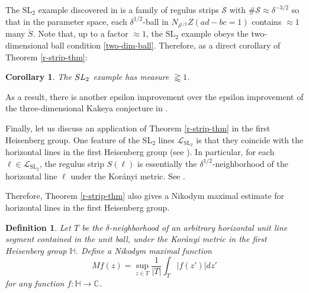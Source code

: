 \documentclass{amsart}%
\numberwithin{equation}{section}
\newtheorem{definition}[theorem]{Definition}
\newtheorem{corollary}[theorem]{Corollary}
\newcommand{\de}{\delta}
\newcommand{\cs}{\mathcal S}
\newcommand{\cl}{\mathcal L}
\newcommand{\ZC}{\mathbb{C}}
\newcommand{\1}{\mathbbm{1}}
\newcommand{\ZH}{\mathbb H}
\begin{document}
The $\text{SL}_2$ example discovered in \cite{Katz-Zahl-1} is a family of regulus strips $\cs$ with $\#\cs\approx\de^{-3/2}$ so that in the parameter space, each $\de^{1/2}$-ball in  $N_{\de^{1/2}}Z(ad-bc=1)$ contains $\approx 1$ many $\breve S$. 
Note that, up to a factor $\approx1$, the $\text{SL}_2$ example obeys the two-dimensional ball condition \eqref{two-dim-ball}.
Therefore, as a direct corollary of Theorem \ref{r-strip-thm}:

\begin{corollary}
The $\rm{SL}_2$ example has measure $\gtrapprox 1$.
\end{corollary}
As a result, there is another epsilon improvement over the epsilon improvement of the three-dimensional Kakeya conjecture in \cite{Katz-Zahl-1}.


\medskip

Finally, let us discuss an application of Theorem \ref{r-strip-thm} in the first Heisenberg group.
One feature of the $\text{SL}_2$ lines $\cl_{\text{SL}_2}$ is that they coincide with the horizontal lines in the first Heisenberg group (see \cite{FO}).
In particular, for each $\ell\in \cl_{\text{SL}_2}$, the regulus strip $S(\ell)$ is essentially the $\de^{1/2}$-neighborhood of the horizontal line $\ell$ under the Kor\'anyi metric. See \cite{Liu22}.

Therefore, Theorem \ref{r-strip-thm} also gives a Nikodym maximal estimate for horizontal lines in the first Heisenberg group. 

\begin{definition}
Let $T$ be the $\delta$-neighborhood of an arbitrary horizontal unit line segment contained in the unit ball, under the Kor\'anyi metric in the first Heisenberg group $\ZH$.
Define a Nikodym maximal function
\begin{equation}
\label{Nikodym-maximal}
    Mf(z)=\sup_{z\in T}\frac{1}{|T|}\int_T|f(z')|dz'
\end{equation}
for any function $f:\ZH\to\ZC$. 
\end{definition}
\end{document}

